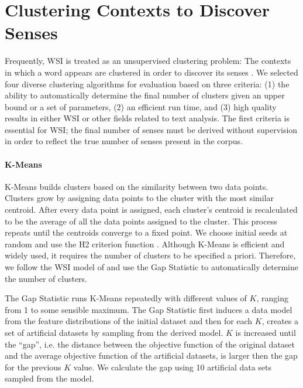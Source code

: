 \documentclass[11pt]{article}
\begin{document}
\section{Clustering Contexts to Discover Senses}
\label{sec:clustering}

Frequently, WSI is treated as an unsupervised clustering problem: The contexts
in which a word appears are clustered in order to discover its senses
\cite{navigli09word}.  
We selected four diverse clustering algorithms for evaluation based on three
criteria: (1) the ability to automatically determine the final number of
clusters given an upper bound or a set of parameters, (2) an efficient run time,
and (3) high quality results in either WSI or other fields related to text
analysis.  The first criteria is essential for WSI; the final number of senses
must be derived without supervision in order to reflect the true number of
senses present in the corpus.

\paragraph{K-Means}
K-Means builds clusters based on the similarity between two data points.
Clusters grow by assigning data points to the cluster with the most similar
centroid.  After every data point is assigned, each cluster's centroid is
recalculated to be the average of all the data points assigned to the cluster.
This process repeats until the centroids converge to a fixed point.  We choose
initial seeds at random and use the H2 criterion function
\cite{zhao02criterionfunctions}.  Although K-Means is efficient and widely used,
it requires the number of clusters to be specified a priori.  Therefore, we
follow the WSI model of  and use the Gap
Statistic \cite{tibshirani00estimating} to automatically determine the number of
clusters.

The Gap Statistic runs K-Means repeatedly with different values of $K$, ranging
from 1 to some sensible maximum.  The Gap Statistic first induces a data model
from the feature distributions of the initial dataset and then for each $K$,
creates a set of artificial datasets by sampling from the derived model.  $K$ is
increased until the ``gap'', i.e.  the distance between the objective function
of the original dataset and the average objective function of the artificial
datasets, is larger then the gap for the previous $K$ value.  We calculate the gap using
10 artificial data sets sampled from the model.
\end{document}
